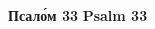 \documentclass[twoside]{article}
\newcommand{\LITTITLE}[1]{\textbf{#1}} %
\newcommand{\LITNOTE} [1]{\textit{#1}} %
\begin{document}
\begin{paracol}{2}
\begin{comment}
\begin{paracol}{2}
\LITNOTE{[The sermon is given here (Serbian tradition).]}
\switchcolumn
\LITNOTE{}
\end{paracol}
\end{comment}


\clearpage
{\Large
\begin{paracol}{2}
{
\LITTITLE{Псал\'{о}м 33}
}
\switchcolumn
\LITTITLE{Psalm 33}
\end{paracol}
}
\begin{comment}
\begin{paracol}{2}
Благословл\'{ю} Г\'{о}спода на вс\'{я}кое вр\'{е}мя,/ в\'{ы}ну хвал\'{а} Ег\'{о} во уст\'{е}х мо\'{и}х.\\
О Г\'{о}споде похв\'{а}лится душ\'{а} мо\'{я},/ да усл\'{ы}шат кр\'{о}тцыи, и возвесел\'{я}тся.\\
Возвел\'{и}чите Г\'{о}спода со мн\'{о}ю,/ и вознес\'{е}м \'{И}мя Ег\'{о} вк\'{у}пе.\\
Взыск\'{а}х Г\'{о}спода, и усл\'{ы}ша мя,/ и от вс\'{е}х скорб\'{е}й мо\'{и}х изб\'{а}ви мя.\\
Приступ\'{и}те к Нем\'{у}, и просвет\'{и}теся,/ и л\'{и}ца в\'{а}ша не посты\-д\'{я}тся.\\
Сей н\'{и}щий воззв\'{а}, и Госп\'{о}дь усл\'{ы}ша и,/ и от вс\'{е}х скорб\'{е}й ег\'{о} спас\'{е} и.\\
Ополч\'{и}тся \'{а}нгел Госп\'{о}день \'{о}крест бо\'{я}щихся Ег\'{о},/ и из\-б\'{а}вит их./ Вкус\'{и}те и в\'{и}дите, \'{я}ко благ Госп\'{о}дь:\\
блаж\'{е}н муж, \'{и}же упов\'{а}ет Нань./ Б\'{о}йтеся Г\'{о}спода, вс\'{и} свят\'{и}и Ег\'{о},\\
\'{я}ко несть лиш\'{е}ния бо\'{я}щимся Ег\'{о}./ Бог\'{а}тии обнищ\'{а}ша и взалк\'{а}ша:\\
взыск\'{а}ющии же Г\'{о}спода не лиш\'{а}тся вс\'{я}каго бл\'{а}га./ Прии\-д\'{и}те, ч\'{а}да, посл\'{у}шайте мен\'{е},\\
стр\'{а}ху Госп\'{о}дню науч\'{у} вас./ Кт\'{о} есть челов\'{е}к хот\'{я}й жив\'{о}т,\\
люб\'{я}й дни в\'{и}дети бл\'{а}ги?/ Удерж\'{и} яз\'{ы}к твой от зла,\\
и устн\'{е} тво\'{и}, \'{е}же не глаг\'{о}лати льсти./ Уклон\'{и}ся от зла и сотвор\'{и} бл\'{а}го.\\

\end{comment}
\end{paracol}
\end{document}
